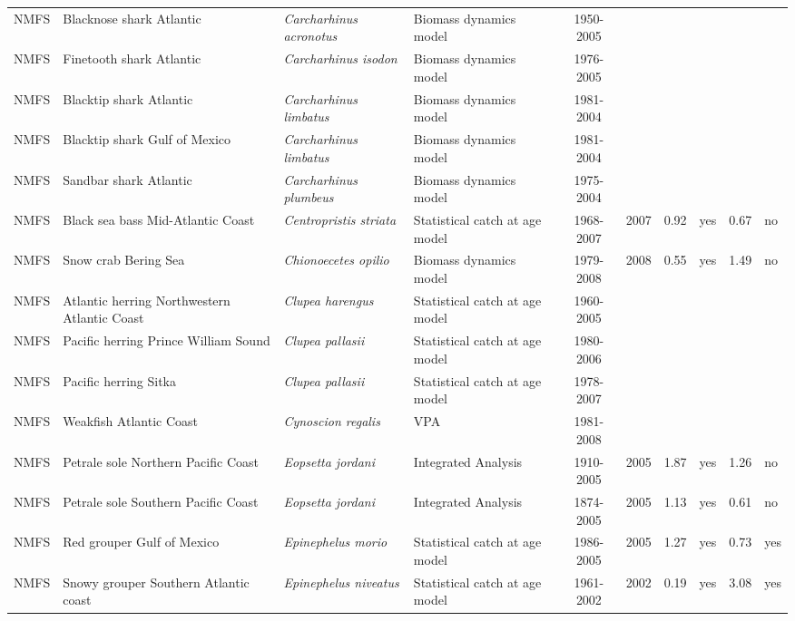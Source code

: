 \begin{longtable}{p{1.8cm}p{3.5cm}p{3.5cm}p{3cm}cccp{0.9cm}cp{0.9cm}}
  NMFS & Blacknose shark Atlantic & \textit{Carcharhinus acronotus} & Biomass dynamics model & 1950-2005 &  &  &  &  &  \\ 
  NMFS & Finetooth shark Atlantic & \textit{Carcharhinus isodon} & Biomass dynamics model & 1976-2005 &  &  &  &  &  \\ 
  NMFS & Blacktip shark Atlantic & \textit{Carcharhinus limbatus} & Biomass dynamics model & 1981-2004 &  &  &  &  &  \\ 
  NMFS & Blacktip shark Gulf of Mexico & \textit{Carcharhinus limbatus} & Biomass dynamics model & 1981-2004 &  &  &  &  &  \\ 
  NMFS & Sandbar shark Atlantic & \textit{Carcharhinus plumbeus} & Biomass dynamics model & 1975-2004 &  &  &  &  &  \\ 
  NMFS & Black sea bass Mid-Atlantic Coast & \textit{Centropristis striata} & Statistical catch at age model & 1968-2007 & 2007 & 0.92 & yes & 0.67 & no \\ 
  NMFS & Snow crab Bering Sea & \textit{Chionoecetes opilio} & Biomass dynamics model & 1979-2008 & 2008 & 0.55 & yes & 1.49 & no \\ 
  NMFS & Atlantic herring Northwestern Atlantic Coast & \textit{Clupea harengus} & Statistical catch at age model & 1960-2005 &  &  &  &  &  \\ 
  NMFS & Pacific herring Prince William Sound & \textit{Clupea pallasii} & Statistical catch at age model & 1980-2006 &  &  &  &  &  \\ 
  NMFS & Pacific herring Sitka & \textit{Clupea pallasii} & Statistical catch at age model & 1978-2007 &  &  &  &  &  \\ 
  NMFS & Weakfish Atlantic Coast & \textit{Cynoscion regalis} & VPA & 1981-2008 &  &  &  &  &  \\ 
  NMFS & Petrale sole Northern Pacific Coast & \textit{Eopsetta jordani} & Integrated Analysis & 1910-2005 & 2005 & 1.87 & yes & 1.26 & no \\ 
  NMFS & Petrale sole Southern Pacific Coast & \textit{Eopsetta jordani} & Integrated Analysis & 1874-2005 & 2005 & 1.13 & yes & 0.61 & no \\ 
  NMFS & Red grouper Gulf of Mexico & \textit{Epinephelus morio} & Statistical catch at age model & 1986-2005 & 2005 & 1.27 & yes & 0.73 & yes \\ 
  NMFS & Snowy grouper Southern Atlantic coast & \textit{Epinephelus niveatus} & Statistical catch at age model & 1961-2002 & 2002 & 0.19 & yes & 3.08 & yes \\ 

\end{longtable}
